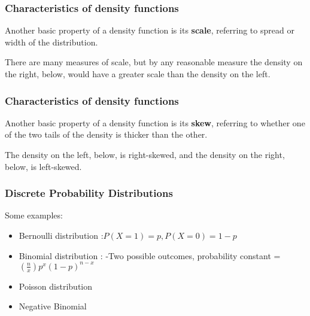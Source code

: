 \begin{frame}
\frametitle{Characteristics of density functions}

Another basic property of a density function is its {\bf scale},
referring to spread or width of the distribution.  

There are many measures of scale, but by any reasonable measure the
density on the right, below, would have a greater scale than the
density on the left.



\end{frame}

\begin{frame}
\frametitle{Characteristics of density functions}

Another basic property of a density function is its {\bf skew},
referring to whether one of the two tails of the density is thicker
than the other.  

The density on the left, below, is right-skewed, and the density on
the right, below, is left-skewed.




\end{frame}


\begin{frame}
\frametitle{Discrete Probability Distributions }
Some examples:
\begin{itemize}
\item Bernoulli distribution :$ P(X = 1) = p,           P(X = 0) = 1- p$
 
\item Binomial distribution : -Two possible outcomes, probability constant = $(\frac{n}{x})p^x (1-p)^{n-x}$
 
\item Poisson distribution 
 
\item Negative Binomial 
\end{itemize}
\end{frame}

